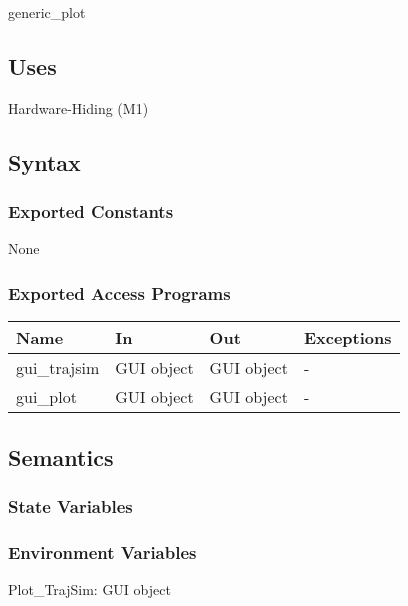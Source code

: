 \documentclass[12pt, titlepage]{article}
\begin{document}
generic\_plot

\subsection{Uses}

Hardware-Hiding (M1)

\subsection{Syntax}

\subsubsection{Exported Constants}

None

\subsubsection{Exported Access Programs}

\begin{center}
\begin{tabular}{p{2cm} p{4cm} p{4cm} p{2cm}}
\hline
\textbf{Name} & \textbf{In} & \textbf{Out} & \textbf{Exceptions} \\
\hline
gui\_trajsim & GUI object & GUI object & - \\
gui\_plot & GUI object & GUI object & - \\
\hline
\end{tabular}
\end{center}

\subsection{Semantics}

\subsubsection{State Variables}

\subsubsection{Environment Variables}

\noindent Plot{\_}TrajSim: GUI object\\
\end{document}
